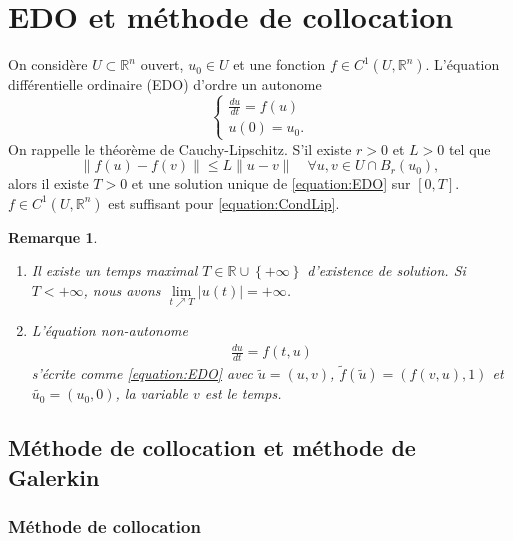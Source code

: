 \documentclass[11pt,a4paper, french]{article}
\newcommand{\R}{\mathbb R}
\newcommand{\abs}[1]{\left|#1\right|}
\newcommand{\norm}[1]{\|#1\|}
\newcommand{\Set}[1]{\left\{#1\right\}}
\newtheorem{remark}[theorem]{Remarque}
\begin{document}
\section{EDO et méthode de collocation}\label{sec:}
%
On considère $U\subset \R^n$ ouvert, $u_0\in U$ et une fonction $f\in C^1(U,\R^n)$. L'équation différentielle ordinaire (EDO) d'ordre un autonome
%
\begin{equation}\label{equation:EDO}
\left\{
\begin{aligned}
\frac{du}{dt} = f(u)\\
u(0) = u_0.
\end{aligned}
\right.
\end{equation}
%
On rappelle le théorème de Cauchy-Lipschitz. S'il existe $r>0$ et $L>0$ tel que
%
\begin{equation}\label{equation:CondLip}
\norm{f(u)-f(v)}\le L\norm{u-v}\quad \forall u,v\in U\cap B_r(u_0),
\end{equation}
%
alors il existe $T>0$ et une solution unique de \eqref{equation:EDO} sur $[0,T]$. $f\in C^1(U,\R^n)$ est suffisant pour \eqref{equation:CondLip}.
%
%
\begin{remark}\label{remark:}
\begin{enumerate}
\item Il existe un temps maximal $T\in\R\cup\Set{+\infty}$ d'existence de solution. Si $T<+\infty$, nous avons $\lim\limits_{t\nearrow T}\abs{u(t)}=+\infty$.
\item L'équation non-autonome
\begin{align*}
\frac{du}{dt} = f(t,u)
\end{align*}
 s'écrite comme \eqref{equation:EDO} avec $\widetilde{u} = (u, v)$, $\widetilde{f}(\widetilde{u}) = (f(v,u),1)$ et $\widetilde{u_0}=(u_0,0)$, la variable $v$ est le temps.
\end{enumerate}
\end{remark}
%
\subsection{Méthode de collocation et méthode de Galerkin}\label{subsec:}
%
\subsubsection{Méthode de collocation}
\end{document}
